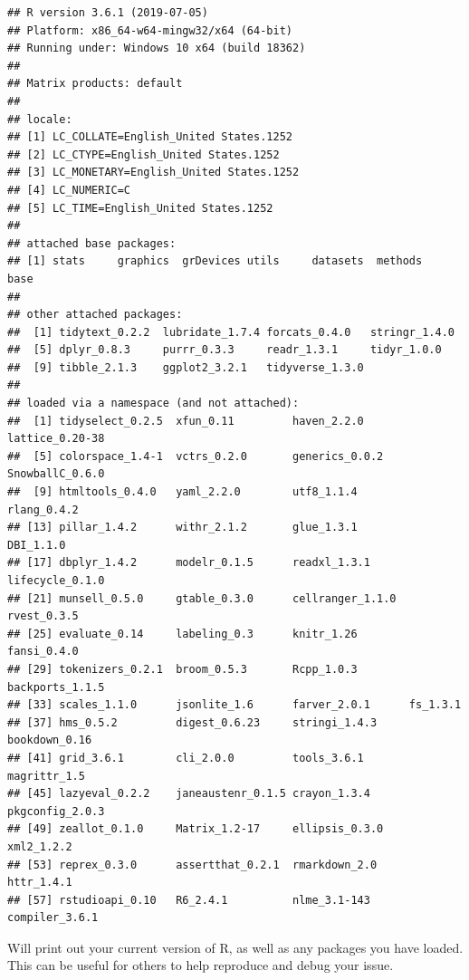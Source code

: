 \documentclass[]{book}
\begin{document}
\begin{verbatim}
## R version 3.6.1 (2019-07-05)
## Platform: x86_64-w64-mingw32/x64 (64-bit)
## Running under: Windows 10 x64 (build 18362)
## 
## Matrix products: default
## 
## locale:
## [1] LC_COLLATE=English_United States.1252 
## [2] LC_CTYPE=English_United States.1252   
## [3] LC_MONETARY=English_United States.1252
## [4] LC_NUMERIC=C                          
## [5] LC_TIME=English_United States.1252    
## 
## attached base packages:
## [1] stats     graphics  grDevices utils     datasets  methods   base     
## 
## other attached packages:
##  [1] tidytext_0.2.2  lubridate_1.7.4 forcats_0.4.0   stringr_1.4.0  
##  [5] dplyr_0.8.3     purrr_0.3.3     readr_1.3.1     tidyr_1.0.0    
##  [9] tibble_2.1.3    ggplot2_3.2.1   tidyverse_1.3.0
## 
## loaded via a namespace (and not attached):
##  [1] tidyselect_0.2.5  xfun_0.11         haven_2.2.0       lattice_0.20-38  
##  [5] colorspace_1.4-1  vctrs_0.2.0       generics_0.0.2    SnowballC_0.6.0  
##  [9] htmltools_0.4.0   yaml_2.2.0        utf8_1.1.4        rlang_0.4.2      
## [13] pillar_1.4.2      withr_2.1.2       glue_1.3.1        DBI_1.1.0        
## [17] dbplyr_1.4.2      modelr_0.1.5      readxl_1.3.1      lifecycle_0.1.0  
## [21] munsell_0.5.0     gtable_0.3.0      cellranger_1.1.0  rvest_0.3.5      
## [25] evaluate_0.14     labeling_0.3      knitr_1.26        fansi_0.4.0      
## [29] tokenizers_0.2.1  broom_0.5.3       Rcpp_1.0.3        backports_1.1.5  
## [33] scales_1.1.0      jsonlite_1.6      farver_2.0.1      fs_1.3.1         
## [37] hms_0.5.2         digest_0.6.23     stringi_1.4.3     bookdown_0.16    
## [41] grid_3.6.1        cli_2.0.0         tools_3.6.1       magrittr_1.5     
## [45] lazyeval_0.2.2    janeaustenr_0.1.5 crayon_1.3.4      pkgconfig_2.0.3  
## [49] zeallot_0.1.0     Matrix_1.2-17     ellipsis_0.3.0    xml2_1.2.2       
## [53] reprex_0.3.0      assertthat_0.2.1  rmarkdown_2.0     httr_1.4.1       
## [57] rstudioapi_0.10   R6_2.4.1          nlme_3.1-143      compiler_3.6.1
\end{verbatim}

Will print out your current version of R, as well as any packages you
have loaded. This can be useful for others to help reproduce and debug
your issue.
\end{document}
